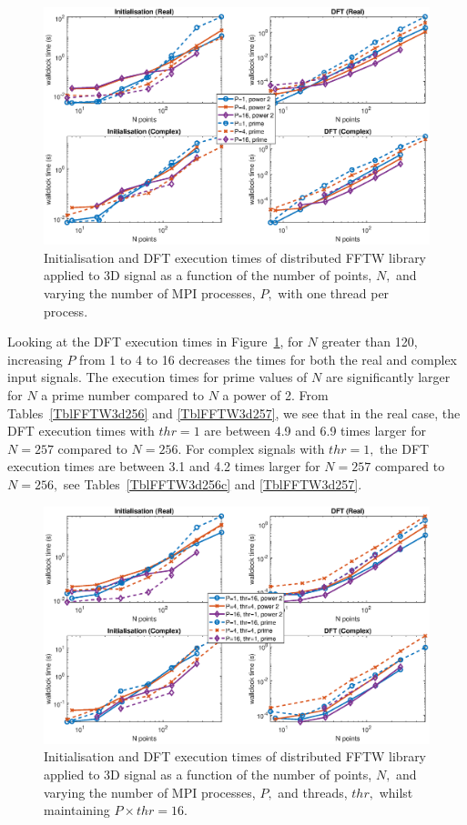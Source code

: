 \documentclass[a4paper]{article}
\begin{document}
\begin{figure}[htb]
    \centering
    \includegraphics[width=0.9\linewidth]{../results/fftw_3d_mpi.eps}
  \caption{Initialisation and DFT execution times of distributed FFTW library applied to 3D signal as a function of the
    number of points, $N,$ and varying the number of MPI processes, $P,$ with one thread per process.}
  \label{3DDistFFTW}
\end{figure}

Looking at the DFT execution times in Figure~\ref{3DDistFFTW}, for $N$
greater than 120, increasing $P$ from 1 to 4 to 16 decreases the times
for both the real and complex input signals. The execution times for
prime values of $N$ are significantly larger for $N$ a prime number
compared to $N$ a power of 2. From Tables~\ref{TblFFTW3d256} and
\ref{TblFFTW3d257}, we see that in the real case, the DFT execution
times with $thr=1$ are between 4.9 and 6.9 times larger for $N=257$
compared to $N=256.$ For complex signals with $thr=1,$ the DFT
execution times are between 3.1 and 4.2 times larger for $N=257$
compared to $N=256,$ see Tables~\ref{TblFFTW3d256c} and
\ref{TblFFTW3d257}.

\begin{figure}[htb]
    \centering
    \includegraphics[width=0.9\linewidth]{../results/fftw_3d_mpi_thr.eps}
  \caption{Initialisation and DFT execution times of distributed FFTW library applied to 3D signal as a function of the
    number of points, $N,$ and varying the number of MPI processes, $P,$ and threads, $thr,$ whilst maintaining $P\times thr=16.$}
  \label{3DDistFFTW16}
\end{figure}
\end{document}
